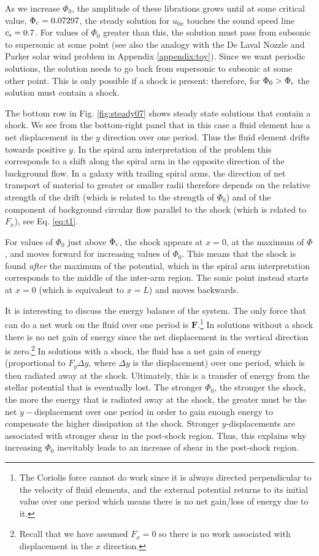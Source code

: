 \documentclass[useAMS,usenatbib]{mn2e}
\begin{document}
As we increase $\Phi_0$, the amplitude of these librations grows until at some critical value, $\Phi_{\rm c}=0.07297$, the steady solution for $u_{0x}$ touches the sound speed line $c_{\rm s}=0.7$. For values of $\Phi_0$ greater than this, the solution must pass from subsonic to supersonic at some point (see also the analogy with the De Laval Nozzle and Parker solar wind problem in Appendix \ref{appendix:toy}). Since we want periodic solutions, the solution needs to go back from supersonic to subsonic at some other point. This is only possible if a shock is present: therefore, for $\Phi_0>\Phi_{\rm c}$ the solution must contain a shock. 

The bottom row in Fig. \ref{fig:steady07} shows steady state solutions that contain a shock. We see from the bottom-right panel that in this case a fluid element has a net displacement in the $y$ direction over one period. Thus the fluid element drifts towards positive $y$. In the spiral arm interpretation of the problem this corresponds to a shift along the spiral arm in the opposite direction of the background flow. In a galaxy with trailing spiral arms, the direction of net transport of material to greater or smaller radii therefore depends on the relative strength of the drift (which is related to the strength of $\Phi_0$) and of the component of background circular flow parallel to the shock (which is related to $F_x$), see Eq. \eqref{eq:t1}. 

For values of $\Phi_0$ just above $\Phi_{\rm c}$, the shock appears at $x=0$, at the maximum of $\Phi$, and moves forward for increasing values of $\Phi_0$. This means that the shock is found \emph{after} the maximum of the potential, which in the spiral arm interpretation corresponds to the middle of the inter-arm region. The sonic point instead starts at $x=0$ (which is equivalent to $x=L$) and moves backwards.

It is interesting to discuss the energy balance of the system. The only force that can do a net work on the fluid over one period is $\mathbf{F}$.\footnote{The Coriolis force cannot do work since it is always directed perpendicular to the velocity of fluid elements, and the external potential returns to its initial value over one period which means there is no net gain/loss of energy due to it.} In solutions without a shock there is no net gain of energy since the net displacement in the vertical direction is zero.\footnote{Recall that we have assumed $F_x=0$ so there is no work associated with displacement in the $x$ direction.} In solutions with a shock, the fluid has a net gain of energy (proportional to $F_y\Delta y$, where $\Delta y$ is the displacement) over one period, which is then radiated away at the shock. Ultimately, this is a transfer of energy from the stellar potential that is eventually lost. The stronger $\Phi_0$, the stronger the shock, the more the energy that is radiated away at the shock, the greater must be the net $y-$displacement over one period in order to gain enough energy to compensate the higher dissipation at the shock. Stronger $y$-displacements are associated with stronger shear in the post-shock region. Thus, this explains why increasing $\Phi_0$ inevitably leads to an increase of shear in the post-shock region. 
\end{document}
